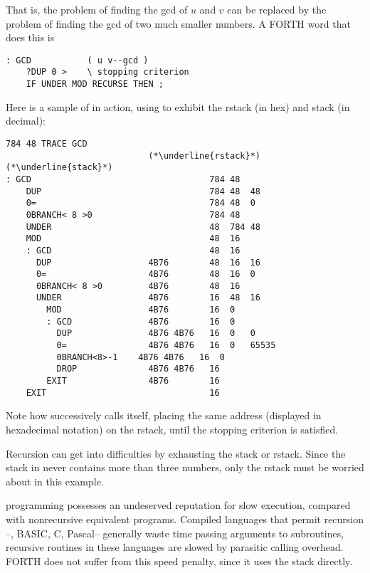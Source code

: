 That is, the problem of finding the gcd of $u$ and $v$ can be replaced by the problem of finding the gcd of two much smaller numbers. A FORTH word that does this is

\begin{lstlisting}
: GCD           ( u v--gcd )
    ?DUP 0 >    \ stopping criterion
    IF UNDER MOD RECURSE THEN ;
\end{lstlisting}

Here is a sample of  in action, using  to exhibit the rstack (in hex) and stack (in decimal):

\begin{lstlisting}
784 48 TRACE GCD
                            (*\underline{rstack}*)       (*\underline{stack}*)
: GCD                                   784 48
    DUP                                 784 48  48
    0=                                  784 48  0
    0BRANCH< 8 >0                       784 48
    UNDER                               48  784 48
    MOD                                 48  16
    : GCD                               48  16
      DUP                   4B76        48  16  16
      0=                    4B76        48  16  0
      0BRANCH< 8 >0         4B76        48  16
      UNDER                 4B76        16  48  16
        MOD                 4B76        16  0
        : GCD               4B76        16  0
          DUP               4B76 4B76   16  0   0
          0=                4B76 4B76   16  0   65535
          0BRANCH<8>-1    4B76 4B76   16  0
          DROP              4B76 4B76   16
        EXIT                4B76        16
    EXIT                                16
\end{lstlisting}

Note how  successively calls itself, placing the same address (displayed in hexadecimal notation) on the rstack, until the stopping criterion is satisfied.

Recursion can get into difficulties by exhausting the stack or rstack. Since the stack in  never contains more than three numbers, only the rstack must be worried about in this example.

 programming possesses an undeserved reputation for slow execution, compared with nonrecursive equivalent programs. Compiled languages that permit recursion --\eg, BASIC, C, Pascal-- generally waste time passing arguments to subroutines, \ie recursive routines in these languages are slowed by parasitic calling overhead. FORTH does not suffer from this speed penalty, since it uses the stack directly.

